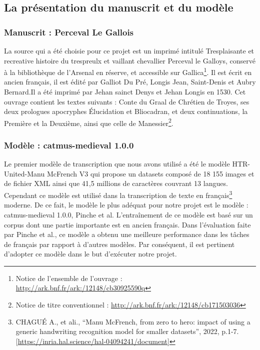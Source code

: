 \documentclass[12pt]{article}
\begin{document}
\subsection{La présentation du manuscrit et du modèle}

\subsubsection{Manuscrit : Perceval Le Gallois}
La source qui a été choisie pour ce projet est un imprimé intitulé Tresplaisante et recreative histoire du trespreulx et vaillant chevallier Perceval le Galloys, conservé à la bibliothèque de l’Arsenal en réserve, et accessible sur Gallica\footnote{Notice de l’ensemble de l’ouvrage : \href{http://ark.bnf.fr/ark:/12148/cb30925590q}{http://ark.bnf.fr/ark:/12148/cb30925590q}}. Il est écrit en ancien français, il est édité par Galliot Du Pré, Longis Jean, Saint-Denis et Aubry Bernard.Il a été imprimé par Jehan sainct Denys et Jehan Longis en 1530. Cet ouvrage contient les textes suivants : Conte du Graal de Chrétien de Troyes, ses deux prologues apocryphes Élucidation et Bliocadran, et deux continuations, la Première et la Deuxième, ainsi que celle de Manessier\footnote{Notice de titre conventionnel : \href{http://ark.bnf.fr/ark:/12148/cb171503036}{http://ark.bnf.fr/ark:/12148/cb171503036}}.


\subsubsection{Modèle : \acrshort{catmus-medieval} 1.0.0}
Le premier modèle de transcription que nous avons utilisé a été le modèle HTR-United-Manu McFrench V3 qui propose un datasets composé de 18 155 images et de fichier XML ainsi que 41,5 millions de caractères couvrant 13 langues. Cependant ce modèle est utilisé dans la transcription de texte en français\footnote{CHAGUÉ A., et ali., “Manu McFrench, from zero to hero: impact of using a generic handwriting recognition model for smaller datasets”, 2022, p.1-7. [\href{https://inria.hal.science/hal-04094241/document}{https://inria.hal.science/hal-04094241/document}]} moderne. De ce fait, le modèle le plus adéquat pour notre projet est le modèle : \acrshort{catmus-medieval} 1.0.0, Pinche et al. L’entraînement de ce modèle est basé sur un corpus dont une partie importante est en ancien français. Dans l’évaluation faite par Pinche et al., ce modèle a obtenu une meilleure performance dans les tâches de français par rapport à d'autres modèles. Par conséquent, il est pertinent d’adopter ce modèle dans le but d’exécuter notre projet.
\end{document}
